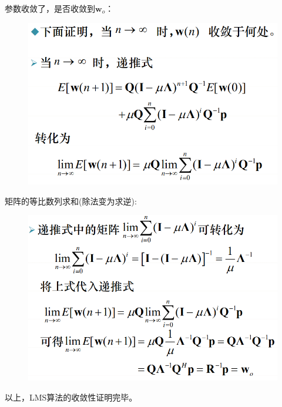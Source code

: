 \documentclass[UTF8]{ctexart} %
\begin{document}
			参数收敛了，是否收敛到$\textbf{w}_o$：
			\begin{figure}[H]
				\centering\includegraphics[scale=0.4]{32.png}
			\end{figure}
			矩阵的等比数列求和(除法变为求逆):
			\begin{figure}[H]
				\centering\includegraphics[scale=0.4]{33.png}
			\end{figure}
			以上，LMS算法的收敛性证明完毕。
				
\end{document}
